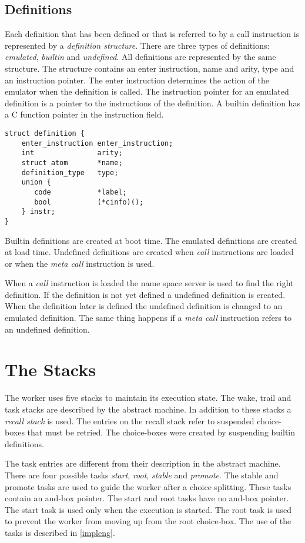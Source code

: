 \subsection*{Definitions}

Each definition that has been defined or that is referred to by a call
instruction is represented by a {\em definition structure}.  There are
three types of definitions: {\em emulated}, {\em builtin} and {\em
undefined}. All definitions are represented by the same structure. The
structure contains an enter instruction, name and arity, type and an
instruction pointer. The enter instruction determines the action of
the emulator when the definition is called. The instruction pointer for
an emulated definition is a pointer to the instructions of the
definition. A builtin definition has a C function pointer in the
instruction field.

\begin{verbatim}
struct definition {
    enter_instruction enter_instruction;
    int               arity;
    struct atom       *name;
    definition_type   type;
    union {
       code           *label;
       bool           (*cinfo)();
    } instr;
}
\end{verbatim}

Builtin definitions are created at boot time. The 
emulated definitions are created at load time. Undefined 
definitions are created when {\em call} instructions are loaded or
when the {\em meta call} instruction is used. 

When a {\em call} instruction is loaded the name space server is 
used to find the right definition. If the definition  
is not yet defined a undefined definition is created. When the 
definition later is defined  the undefined definition is 
changed to an emulated definition. The same thing happens if 
a {\em meta call} instruction refers to an undefined definition.

\section{The Stacks}

The worker uses five stacks to maintain its execution state. The wake,
trail and task stacks are described by the abstract machine. In
addition to these stacks a {\em recall stack} is used. The entries on
the recall stack refer to suspended choice-boxes that must be retried.
The choice-boxes were created by suspending builtin definitions.

The task entries are different from their description in the abstract
machine. There are four possible tasks {\em start}, {\em root}, {\em
stable} and {\em promote}. The stable and promote tasks are used to
guide the worker after a choice splitting. These tasks contain an
and-box pointer.  The start and root tasks have no and-box pointer.
The start task is used only when the execution is started. The root
task is used to prevent the worker from moving up from the root
choice-box. The use of the  tasks is described in \ref{impleng}.

